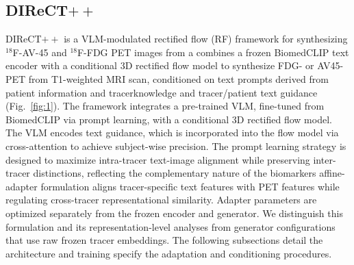 \documentclass{article}
\providecommand{\DIFaddtex}[1]{{\protect\color{blue} \sf #1}} %
\providecommand{\DIFdeltex}[1]{{\protect\color{red} \scriptsize #1}} %
\providecommand{\DIFaddbegin}{} %
\providecommand{\DIFaddend}{} %
\providecommand{\DIFdelbegin}{} %
\providecommand{\DIFdelend}{} %
\providecommand{\DIFadd}[1]{\texorpdfstring{\DIFaddtex{#1}}{#1}} %
\providecommand{\DIFdel}[1]{\texorpdfstring{\DIFdeltex{#1}}{}} %
\newcommand{\DIFscaledelfig}{0.5}
\newlength{\DIFdelgraphicswidth} %
\newlength{\DIFdelgraphicsheight} %
\newcommand{\DIFaddincludegraphics}[2][]{{\color{blue}\fbox{\DIFOincludegraphics[#1]{#2}}}} %
\newcommand{\DIFdelincludegraphics}[2][]{%
\sbox{\DIFdelgraphicsbox}{\DIFOincludegraphics[#1]{#2}}%
\settoboxwidth{\DIFdelgraphicswidth}{\DIFdelgraphicsbox} %
\settoboxtotalheight{\DIFdelgraphicsheight}{\DIFdelgraphicsbox} %
\scalebox{\DIFscaledelfig}{%
\parbox[b]{\DIFdelgraphicswidth}{\usebox{\DIFdelgraphicsbox}\\[-\baselineskip] \rule{\DIFdelgraphicswidth}{0em}}\llap{\resizebox{\DIFdelgraphicswidth}{\DIFdelgraphicsheight}{%
\setlength{\unitlength}{\DIFdelgraphicswidth}%
\begin{picture}(1,1)%
\thicklines\linethickness{2pt} %
{\color[rgb]{1,0,0}\put(0,0){\framebox(1,1){}}}%
{\color[rgb]{1,0,0}\put(0,0){\line( 1,1){1}}}%
{\color[rgb]{1,0,0}\put(0,1){\line(1,-1){1}}}%
\end{picture}%
}\hspace*{3pt}}} %
} %
\DeclareRobustCommand{\DIFaddbegin}{\DIFOaddbegin \let\includegraphics\DIFaddincludegraphics} %
\DeclareRobustCommand{\DIFaddend}{\DIFOaddend \let\includegraphics\DIFOincludegraphics} %
\DeclareRobustCommand{\DIFdelbegin}{\DIFOdelbegin \let\includegraphics\DIFdelincludegraphics} %
\DeclareRobustCommand{\DIFdelend}{\DIFOaddend \let\includegraphics\DIFOincludegraphics} %
\begin{document}
\subsection{\texorpdfstring{DIReCT$++$}{DIReCT++}}
DIReCT$++$ \DIFdelbegin \DIFdel{is a VLM-modulated rectified flow (RF) framework for synthesizing $^{18}$F-AV-45 and $^{18}$F-FDG PET images from a }\DIFdelend \DIFaddbegin \DIFadd{combines a frozen BiomedCLIP text encoder with a conditional 3D rectified flow model to synthesize FDG- or AV45-PET from }\DIFaddend T1-weighted MRI \DIFdelbegin \DIFdel{scan, conditioned on text prompts derived from patient information and tracerknowledge }\DIFdelend \DIFaddbegin \DIFadd{and tracer/patient text guidance }\DIFaddend (Fig.~\ref{fig:1}). The \DIFdelbegin \DIFdel{framework integrates a pre-trained VLM, fine-tuned from BiomedCLIP via prompt learning, with a conditional 3D rectified flow model. The VLM encodes text guidance, which is incorporated into the flow model via cross-attention to achieve subject-wise precision. The prompt learning strategy is designed to maximize intra-tracer text-image alignment while preserving inter-tracer distinctions, reflecting the complementary nature of the biomarkers}\DIFdelend \DIFaddbegin \DIFadd{affine-adapter formulation aligns tracer-specific text features with PET features while regulating cross-tracer representational similarity. Adapter parameters are optimized separately from the frozen encoder and generator. We distinguish this formulation and its representation-level analyses from generator configurations that use raw frozen tracer embeddings}\DIFaddend . The following subsections \DIFdelbegin \DIFdel{detail the architecture and training}\DIFdelend \DIFaddbegin \DIFadd{specify the adaptation and conditioning procedures}\DIFaddend .
\end{document}
